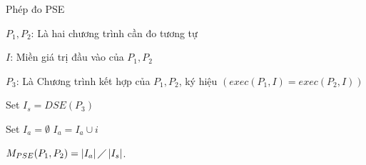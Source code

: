 \begin{algorithm}[H]
	\caption{Phép đo PSE}
	\begin{algorithmic}	
		\item $P_{1}, P_{2}$: Là hai chương trình cần đo tương tự
		\item $I$: Miền giá trị đầu vào của $P_{1}, P_{2}$
		\item $P_{3}$: Là Chương trình kết hợp của $P_{1}, P_{2}$, ký hiệu  $(exec(P_{1}, I) = exec(P_{2}, I))$
		\item Set $I_{s} = DSE(P_{3})$ 
		\item Set $I_{a} = \emptyset$ 
		  		
			\State $I_{a} = I_{a} \cup i$		
			\EndIf
		\EndWhile
		\item $M_{PSE}(P_{1}, P_{2}) = \left|I_{a}\right| \diagup \left|I_{s}\right| $. 
	\end{algorithmic}
\end{algorithm}


